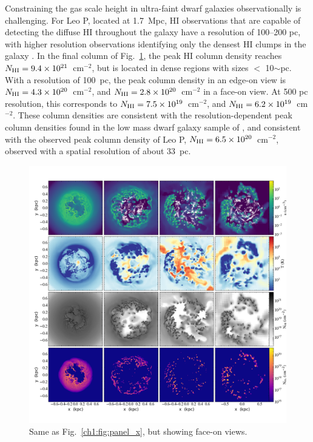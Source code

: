 Constraining the gas scale height in ultra-faint dwarf galaxies observationally is challenging. For Leo P, located at 1.7~Mpc, HI observations that are capable of detecting the diffuse HI throughout the galaxy have a resolution of 100--200 pc, with higher resolution observations identifying only the densest HI clumps in the galaxy \citep[e.g.][]{Bernstein-Cooper2014}. In the final column of Fig.~\ref{ch1:fig:panel_z}, the peak HI column density reaches $N_{\rm HI} = 9.4 \times 10^{21}$~cm$^{-2}$, but is located in dense regions with sizes $<$ 10$\sim$pc. With a resolution of 100~pc, the peak column density in an edge-on view is $N_{\rm HI} = 4.3 \times 10^{20}$~cm$^{-2}$, and $N_{\rm HI} = 2.8 \times 10^{20}$~cm$^{-2}$ in a face-on view. At 500 pc resolution, this corresponds to $N_{\rm HI} = 7.5 \times 10^{19}$~cm$^{-2}$, and $N_{\rm HI} = 6.2 \times 10^{19}$~cm$^{-2}$. These column densities are consistent with the resolution-dependent peak column densities found in the low mass dwarf galaxy sample of \cite{Teich2016}, and consistent with the observed peak column density of Leo P, $N_{\rm HI} = 6.5 \times 10^{20}$~cm$^{-2}$, observed with a spatial resolution of about 33~pc.

\begin{figure}
\centering
\includegraphics[width=0.975\linewidth]{figures/ch1/multiplot_4x4_z.png}
\caption{Same as Fig.~\ref{ch1:fig:panel_x}, but showing face-on views.}
\label{ch1:fig:panel_z}
\end{figure}


